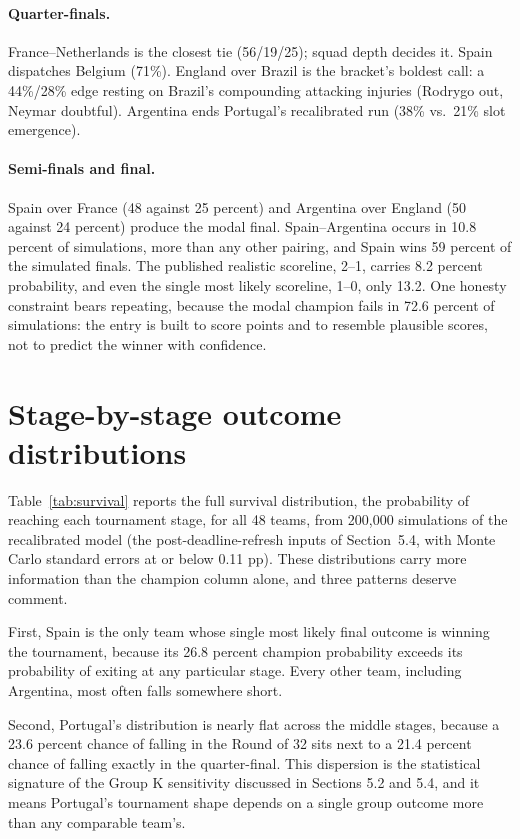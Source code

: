 \documentclass[11pt,letterpaper]{article}
\begin{document}
\paragraph{Quarter-finals.} France--Netherlands is the closest tie (56/19/25); squad depth decides it. Spain dispatches Belgium (71\%). England over Brazil is the bracket's boldest call: a 44\%/28\% edge resting on Brazil's compounding attacking injuries (Rodrygo out, Neymar doubtful). Argentina ends Portugal's recalibrated run (38\% vs.\ 21\% slot emergence).

\paragraph{Semi-finals and final.} Spain over France (48 against 25 percent) and Argentina over England (50 against 24 percent) produce the modal final. Spain--Argentina occurs in 10.8 percent of simulations, more than any other pairing, and Spain wins 59 percent of the simulated finals. The published realistic scoreline, 2--1, carries 8.2 percent probability, and even the single most likely scoreline, 1--0, only 13.2. One honesty constraint bears repeating, because the modal champion fails in 72.6 percent of simulations: the entry is built to score points and to resemble plausible scores, not to predict the winner with confidence.

\section{Stage-by-stage outcome distributions}\label{app:survival}

Table~\ref{tab:survival} reports the full survival distribution, the probability of reaching each tournament stage, for all 48 teams, from 200{,}000 simulations of the recalibrated model (the post-deadline-refresh inputs of Section~5.4, with Monte Carlo standard errors at or below 0.11 pp). These distributions carry more information than the champion column alone, and three patterns deserve comment.

First, Spain is the only team whose single most likely final outcome is winning the tournament, because its 26.8 percent champion probability exceeds its probability of exiting at any particular stage. Every other team, including Argentina, most often falls somewhere short.

Second, Portugal's distribution is nearly flat across the middle stages, because a 23.6 percent chance of falling in the Round of 32 sits next to a 21.4 percent chance of falling exactly in the quarter-final. This dispersion is the statistical signature of the Group K sensitivity discussed in Sections 5.2 and 5.4, and it means Portugal's tournament shape depends on a single group outcome more than any comparable team's.
\end{document}
